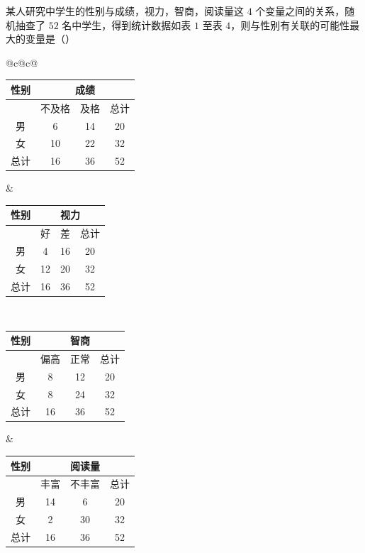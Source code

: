 \begin{problem}
某人研究中学生的性别与成绩，视力，智商，阅读量这 \(4\) 个变量之间的关系，随机抽查了 \(52\) 名中学生，得到统计数据如表 \(1\) 至表 \(4\)，则与性别有关联的可能性最大的变量是（\quad）

\begin{center}
\setlength{\tabcolsep}{4pt}
\renewcommand{\arraystretch}{1.1}
\begin{tabular}{@{}c@{\hspace{1em}}c@{}}
\begin{minipage}[t]{0.46\linewidth}
\centering
\begin{tabular}{c|ccc}
\multicolumn{1}{c|}{性别} & \multicolumn{3}{c}{成绩} \\
\hline
 & 不及格 & 及格 & 总计 \\
\hline
男 & 6 & 14 & 20 \\
女 & 10 & 22 & 32 \\
总计 & 16 & 36 & 52 \\
\hline
\end{tabular}

\end{minipage}
&
\begin{minipage}[t]{0.46\linewidth}
\centering
\begin{tabular}{c|ccc}
\multicolumn{1}{c|}{性别} & \multicolumn{3}{c}{视力} \\
\hline
 & 好 & 差 & 总计 \\
\hline
男 & 4 & 16 & 20 \\
女 & 12 & 20 & 32 \\
总计 & 16 & 36 & 52 \\
\hline
\end{tabular}

\end{minipage}
\\
\begin{minipage}[t]{0.46\linewidth}
\centering
\begin{tabular}{c|ccc}
\multicolumn{1}{c|}{性别} & \multicolumn{3}{c}{智商} \\
\hline
 & 偏高 & 正常 & 总计 \\
\hline
男 & 8 & 12 & 20 \\
女 & 8 & 24 & 32 \\
总计 & 16 & 36 & 52 \\
\hline
\end{tabular}

\end{minipage}
&
\begin{minipage}[t]{0.46\linewidth}
\centering
\begin{tabular}{c|ccc}
\multicolumn{1}{c|}{性别} & \multicolumn{3}{c}{阅读量} \\
\hline
 & 丰富 & 不丰富 & 总计 \\
\hline
男 & 14 & 6 & 20 \\
女 & 2 & 30 & 32 \\
总计 & 16 & 36 & 52 \\
\hline
\end{tabular}


\end{minipage}
\end{tabular}
\end{center}
\end{problem}
